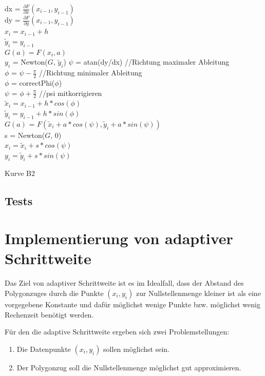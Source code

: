 \documentclass[a4paper,11pt,bibliography=totoc,listof=totoc,headinclude=true,cleardoublepage=empty,oneside]{scrartcl}
\newcommand{\diff}[2]{\frac{\partial #1}{\partial #2}}
\begin{document}
\begin{algorithm}[h]
	\label{alg:B_V2}
	{
		dx = $\diff{F}{x}(x_{i-1},y_{i-1})$\\
		dy = $\diff{F}{y}(x_{i-1},y_{i-1})$\\
		{
			$x_i = x_{i-1}+h$\\
			$\tilde y_i = y_{i-1}$\\
			$G(a) = F(x_i,a)$\\
			$y_i$ = Newton($G$, $\tilde y_i$)	
		}
		{
			$\psi$ = atan(dy/dx)			//Richtung maximaler Ableitung\\
			$\phi$ = $\psi-\frac{\pi}{2}$	//Richtung minimaler Ableitung\\
			$\phi$ = correctPhi($\phi$)\\
			$\psi$ = $\phi+\frac{\pi}{2}$	//psi mitkorrigieren\\
			$\tilde x_i = x_{i-1}+h*cos(\phi)$\\
			$\tilde y_i = y_{i-1}+h*sin(\phi)$\\
			$G(a)$ = $F(\tilde x_i+a*cos(\psi),\tilde y_i+a*sin(\psi))$\\
			s = Newton($G$, 0)\\
			$x_i = \tilde x_{i}+s*cos(\psi)$\\
			$y_i = \tilde y_{i}+s*sin(\psi)$\\
		}
	}
	\caption{Kurve B2}
\end{algorithm}
\subsection{Tests}


\section{Implementierung von adaptiver Schrittweite}
Das Ziel von adaptiver Schrittweite ist es im Idealfall, dass der Abstand des Polygonzuges durch die Punkte $(x_i,y_i)$ zur Nullstellenmenge kleiner ist als eine vorgegebene Konstante und dafür möglichst wenige Punkte bzw. möglichst wenig Rechenzeit benötigt werden.

Für den die adaptive Schrittweite ergeben sich zwei Problemstellungen:
\begin{enumerate}
	\item Die Datenpunkte $(x_i,y_i)$ sollen möglichst sein.
	\item Der Polygonzug soll die Nullstellenmenge möglichst gut approximieren.
\end{enumerate}
\end{document}
